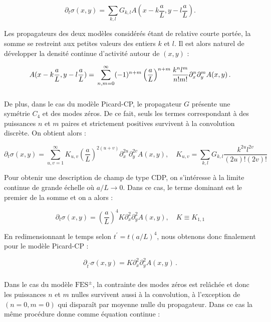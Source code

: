 \begin{equation}
    \partial_t\sigma (x,y) = \sum_{k,l}G_{k,l}A(x-k\frac{a}{L}, y-l\frac{a}{L}).
    \label{eq:2}
\end{equation}

\noindent Les propagateurs des deux modèles considérés étant de relative courte portée, la somme se restreint aux petites valeurs des entiers $k$ et $l$. Il est alors naturel de développer la densité continue d'activité autour de $(x,y)$ :

\begin{equation}
    A(x-k\frac{a}{L}, y-l\frac{a}{L}) = \\ \sum_{n,m=0}^{\infty}(-1)^{n+m}\left( \frac{a}{L} \right)^{n+m}\frac{k^nl^m}{n!m!}\partial_x^n\partial_y^mA(x, y)\, .
\end{equation}

\subparagraph{}De plus, dans le cas du modèle Picard-CP, le propagateur $G$ présente une symétrie $C_4$ et des modes zéros. De ce fait, seuls les termes correspondant à des puissances $n$ et $m$ paires et strictement positives survivent à la convolution discrète. On obtient alors :

\begin{equation}
    \partial_t\sigma (x,y) = \sum_{u,v=1}^{\infty}K_{u,v}\left( \frac{a}{L} \right)^{2(u+v)}\partial_x^{2u}\partial_y^{2v}A(x, y), \quad K_{u,v} = \sum_{k,l}G_{k,l}\frac{k^{2u}l^{2v}}{(2u)!(2v)!}
\label{eq:3}
\end{equation}

\noindent Pour obtenir une description de champ de type CDP, on s'intéresse à la limite continue de grande échelle où $a/L\rightarrow 0$. Dans ce cas, le terme dominant est le premier de la somme et on a alors :

\begin{equation}
    \partial_t\sigma (x,y) = \left( \frac{a}{L} \right)^{4}K\partial_x^{2}\partial_y^{2}A(x, y), \quad K \equiv K_{1,1}
    \label{eq:evol:sigma:CDP0:raw}
\end{equation}

\noindent En redimensionnant le temps selon $t^\prime=t(a/L)^4$, nous obtenons donc finalement pour le modèle Picard-CP :

\begin{equation}
    \partial_{t^\prime}\sigma (x,y) = K\partial_x^{2}\partial_y^{2}A(x, y)\, .
    \label{eq:evol:sigma:CDP0}
\end{equation}

\subparagraph{}Dans le cas du modèle $\text{FES}^\pm$, la contrainte des modes zéros est relâchée et donc les puissances $n$ et $m$ nulles survivent aussi à la convolution, à l'exception de $(n=0,m=0)$ qui disparaît par moyenne nulle du propagateur. Dans ce cas la même procédure donne comme équation continue : 

